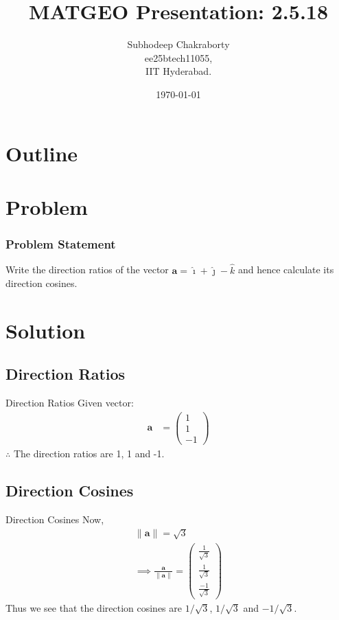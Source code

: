 \documentclass{beamer}
\title{MATGEO Presentation: 2.5.18}
\author{Subhodeep Chakraborty \\ ee25btech11055,\\IIT Hyderabad.}
\date{\today}
\theoremstyle{remark}
\providecommand{\norm}[1]{\lVert#1\rVert}
\newcommand{\myvec}[1]{\ensuremath{\begin{pmatrix}#1\end{pmatrix}}}
\let\vec\mathbf
\numberwithin{equation}{section}
\begin{document}
\begin{frame}
\titlepage
\end{frame}

\section*{Outline}
\begin{frame}
\tableofcontents
\end{frame}

\section{Problem}
\begin{frame}
\frametitle{Problem Statement}

Write the direction ratios of the vector $\vec{a} = \hat{\imath} + \hat{\jmath} - \hat{k}$ and hence calculate its direction cosines.

\end{frame}

\section{Solution}
\subsection{Direction Ratios}
\begin{frame}{Direction Ratios}
Given vector:
\begin{align}
 \vec{a} &= \myvec{1 \\ 1 \\ -1}
\end{align}
$\therefore$ The direction ratios are 1, 1 and -1.
\end{frame}

\subsection{Direction Cosines}
\begin{frame}{Direction Cosines}
Now,
\begin{align*}
\norm{\vec{a}} = \sqrt{3} \\
\implies \frac{\vec{a}}{\norm{\vec{a}}} = \myvec{\frac{1}{\sqrt{3}} \\ \frac{1}{\sqrt{3}} \\ \frac{-1}{\sqrt{3}}}
\end{align*}
Thus we see that the direction cosines are $1/\sqrt{3}$, $1/\sqrt{3}$ and $-1/\sqrt{3}$.
\end{frame}
\end{document}

